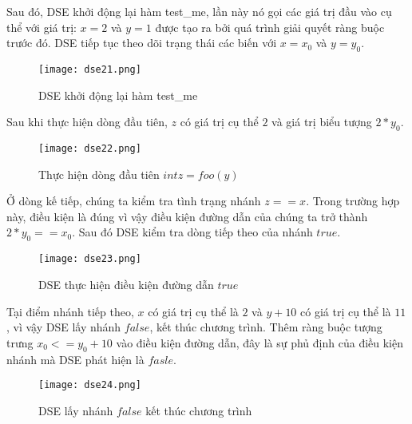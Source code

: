 Sau đó, DSE khởi động lại hàm test\_me, lần này nó gọi các giá trị đầu vào cụ thể với giá trị: $x = 2$ và $y = 1$ được tạo ra bởi quá trình giải quyết ràng buộc trước đó. DSE tiếp tục theo dõi trạng thái các biến với $x = x_{0}$ và $y = y_{0}$.

\begin{center}
	\begin{figure}[H]
		\begin{center}
			\texttt{[image: dse21.png]}
		\end{center}
		\caption{DSE khởi động lại hàm test\_me}
		\label{dse21}
	\end{figure}
\end{center}

Sau khi thực hiện dòng đầu tiên, $z$ có giá trị cụ thể $2$ và giá trị biểu tượng $2*y_{0}$.

\begin{center}
	\begin{figure}[H]
		\begin{center}
			\texttt{[image: dse22.png]}
		\end{center}
		\caption{Thực hiện dòng đầu tiên $int z = foo(y)$}
		\label{dse22}
	\end{figure}
\end{center}

Ở dòng kế tiếp, chúng ta kiểm tra tình trạng nhánh $z == x$. Trong trường hợp này, điều kiện là đúng vì vậy điều kiện đường dẫn của chúng ta trở thành $2*y_{0} == x_{0}$. Sau đó DSE kiểm tra dòng tiếp theo của nhánh $true$.

\begin{center}
	\begin{figure}[H]
		\begin{center}
			\texttt{[image: dse23.png]}
		\end{center}
		\caption{DSE thực hiện điều kiện đường dẫn $true$}
		\label{dse23}
	\end{figure}
\end{center} 

Tại điểm nhánh tiếp theo, $x$ có giá trị cụ thể là $2$ và $y + 10$ có giá trị cụ thể là $11$, vì vậy DSE lấy nhánh $false$, kết thúc chương trình. Thêm ràng buộc tượng trưng $x_{0} <= y_{0} + 10$ vào điều kiện đường dẫn, đây là sự phủ định của điều kiện nhánh mà DSE phát hiện là $fasle$.

\begin{center}
	\begin{figure}[H]
		\begin{center}
			\texttt{[image: dse24.png]}
		\end{center}
		\caption{DSE lấy nhánh $false$ kết thúc chương trình}
		\label{dse24}
	\end{figure}
\end{center} 

